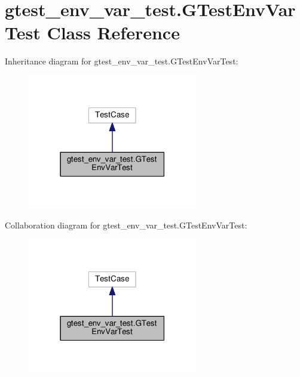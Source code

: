 \hypertarget{classgtest__env__var__test_1_1GTestEnvVarTest}{}\section{gtest\+\_\+env\+\_\+var\+\_\+test.\+G\+Test\+Env\+Var\+Test Class Reference}
\label{classgtest__env__var__test_1_1GTestEnvVarTest}


Inheritance diagram for gtest\+\_\+env\+\_\+var\+\_\+test.\+G\+Test\+Env\+Var\+Test\+:\nopagebreak
\begin{figure}[H]
\begin{center}
\leavevmode
\includegraphics[width=210pt]{classgtest__env__var__test_1_1GTestEnvVarTest__inherit__graph}
\end{center}
\end{figure}


Collaboration diagram for gtest\+\_\+env\+\_\+var\+\_\+test.\+G\+Test\+Env\+Var\+Test\+:\nopagebreak
\begin{figure}[H]
\begin{center}
\leavevmode
\includegraphics[width=210pt]{classgtest__env__var__test_1_1GTestEnvVarTest__coll__graph}
\end{center}
\end{figure}
